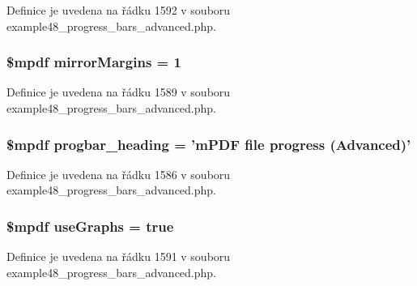 Definice je uvedena na řádku 1592 v souboru example48\-\_\-progress\-\_\-bars\-\_\-advanced.\-php.

\hypertarget{example48__progress__bars__advanced_8php_a24c284cb7774410f65953584ea1fd9c1}{
\subsubsection[{mirror\-Margins}]{\setlength{\rightskip}{0pt plus 5cm}\$mpdf mirror\-Margins = 1}}\label{example48__progress__bars__advanced_8php_a24c284cb7774410f65953584ea1fd9c1}


Definice je uvedena na řádku 1589 v souboru example48\-\_\-progress\-\_\-bars\-\_\-advanced.\-php.

\hypertarget{example48__progress__bars__advanced_8php_a56749e325603f4a2e926e2a4b15554af}{
\subsubsection[{progbar\-\_\-heading}]{\setlength{\rightskip}{0pt plus 5cm}\$mpdf progbar\-\_\-heading = '{\bf m\-P\-D\-F} file progress (Advanced)'}}\label{example48__progress__bars__advanced_8php_a56749e325603f4a2e926e2a4b15554af}


Definice je uvedena na řádku 1586 v souboru example48\-\_\-progress\-\_\-bars\-\_\-advanced.\-php.

\hypertarget{example48__progress__bars__advanced_8php_a789abe3531b709632605a9c52e9ba0d9}{
\subsubsection[{use\-Graphs}]{\setlength{\rightskip}{0pt plus 5cm}\$mpdf use\-Graphs = true}}\label{example48__progress__bars__advanced_8php_a789abe3531b709632605a9c52e9ba0d9}


Definice je uvedena na řádku 1591 v souboru example48\-\_\-progress\-\_\-bars\-\_\-advanced.\-php.

